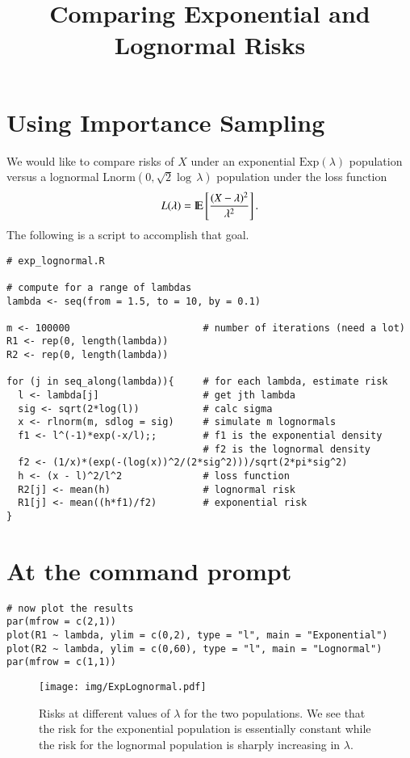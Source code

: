 \documentclass[11pt,english]{article}
\title{Comparing Exponential and Lognormal Risks}
\date{}
\begin{document}
\maketitle


\section*{Using Importance Sampling}
\label{sec-1}


We would like to compare risks of $X$ under an exponential $\mathrm{Exp}(\lambda)$ population versus a lognormal $\mathrm{Lnorm}(0,\sqrt{2}\log\,\lambda)$ population under the loss function
\[
L(\lambda) = \mathrm{I\hspace{-1.5pt}E} \left[\frac{(X - \lambda)^{2}}{\lambda^{2}}\right].
\]
The following is a script to accomplish that goal.
\begin{verbatim}
# exp_lognormal.R

# compute for a range of lambdas
lambda <- seq(from = 1.5, to = 10, by = 0.1)

m <- 100000                       # number of iterations (need a lot)
R1 <- rep(0, length(lambda))
R2 <- rep(0, length(lambda))

for (j in seq_along(lambda)){     # for each lambda, estimate risk
  l <- lambda[j]                  # get jth lambda
  sig <- sqrt(2*log(l))           # calc sigma
  x <- rlnorm(m, sdlog = sig)     # simulate m lognormals
  f1 <- l^(-1)*exp(-x/l);;        # f1 is the exponential density
                                  # f2 is the lognormal density
  f2 <- (1/x)*(exp(-(log(x))^2/(2*sig^2)))/sqrt(2*pi*sig^2) 
  h <- (x - l)^2/l^2              # loss function
  R2[j] <- mean(h)                # lognormal risk
  R1[j] <- mean((h*f1)/f2)        # exponential risk
}
\end{verbatim}
\section*{At the command prompt}
\label{sec-2}


\begin{verbatim}
# now plot the results
par(mfrow = c(2,1))
plot(R1 ~ lambda, ylim = c(0,2), type = "l", main = "Exponential")
plot(R2 ~ lambda, ylim = c(0,60), type = "l", main = "Lognormal")
par(mfrow = c(1,1))
\end{verbatim}

\begin{figure}[h!]
\centering
\texttt{[image: img/ExpLognormal.pdf]}
\caption{\label{fig:yplot}Risks at different values of $\lambda$ for the two populations.  We see that the risk for the exponential population is essentially constant while the risk for the lognormal population is sharply increasing in $\lambda$.}
\end{figure}
\end{document}
